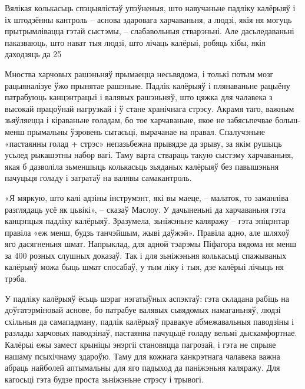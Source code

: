 Вялікая колькасьць спэцыялістаў упэўненыя, што навучаньне падліку калёрыяў і іх штодзённы кантроль – аснова здаровага харчаваньня, а людзі, якія ня могуць прытрымлівацца гэтай сыстэмы, – слабавольныя стварэньні. Але дасьледаваньні паказваюць, што нават тыя людзі, што лічаць калёрыі, робяць хібы, якія даходзяць да 25%

Мноства харчовых рашэньняў прымаецца несьвядома, і толькі потым мозг рацыяналізуе ўжо прынятае рашэньне. Падлік калёрыяў і плянаваньне рацыёну патрабуюць канцэнтрацыі і валявых рашэньняў, што цяжка для чалавека з высокай працоўнай нагрузкай і ў стане хранічнага стрэсу. Акрамя таго, важным зьяўляецца і кіраваньне голадам, бо тое харчаваньне, якое не забясьпечвае больш-менш прымальны ўзровень сытасьці, вырачанае на правал. Спалучэньне «пастаянны голад + стрэс» непазьбежна прывядзе да зрыву, за якім рушыць усьлед рыкашэтны набор вагі. Таму варта ствараць такую сыстэму харчаваньня, якая б дазволіла зьменшыць колькасьць зьяданых калёрыяў без павышэньня пачуцьця голаду і затратаў на валявы самакантроль.

«Я мяркую, што калі адзіны інструмэнт, які вы маеце, – малаток, то заманліва разглядаць усё як цьвікі», -- сказаў Маслоу. У дачыненьні да харчаваньня гэта канцэпцыя падліку калёрыяў. Зразумела, зьніжэньне каляражу – гэта эпіцэнтар правіла «еж менш, будзь танчэйшым, жыві даўжэй». Правіла адно, але шляхоў яго дасягненьня шмат. Напрыклад, для адной тэарэмы Піфагора вядома ня менш за 400 розных слушных доказаў. Так і для зьніжэньня колькасьці спажываных калёрыяў можа быць шмат спосабаў, у тым ліку і тыя, дзе калёрыі лічыць ня трэба.

У падліку калёрыяў ёсьць шэраг нэгатыўных аспэктаў: гэта складана рабіць на доўгатэрміновай аснове, бо патрабуе валявых сьвядомых намаганьняў, людзі схільныя да самападману, падлік калёрыяў правакуе абмежавальныя паводзіны і разлады харчовых паводзінаў, пастаянна пачуцьцё голаду вельмі дыскамфортнае. Калёрыі ежы замест крыніцы энэргіі становяцца пагрозай, і гэта не спрыяе нашаму псыхічнаму здароўю. Таму для кожнага канкрэтнага чалавека важна абраць найболей аптымальны для яго падыход да паніжэньня каляражу. Для кагосьці гэта будзе проста зьніжэньне стрэсу і трывогі.

